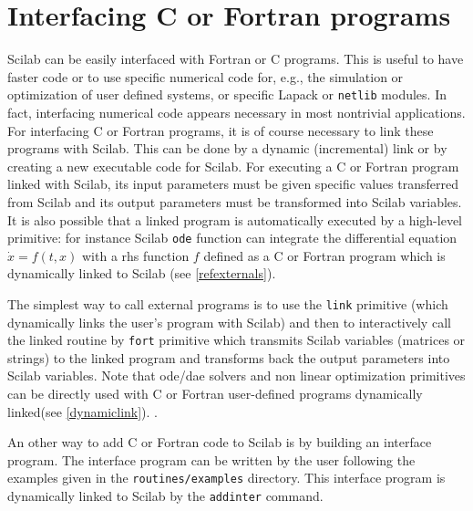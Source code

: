 
%

\chapter{Interfacing C or Fortran programs}

Scilab can be easily interfaced with Fortran or C programs. 
This is useful to have faster code or to use specific numerical
code for, e.g., the simulation or optimization of
user defined systems, or specific Lapack or {\tt netlib} modules. 
In fact, interfacing numerical code appears necessary in most
nontrivial applications. For
interfacing C or Fortran programs, it is of course necessary to link
these programs with Scilab. This can be done by a dynamic
(incremental) link or by creating a new executable code for Scilab.
For executing a C or Fortran program linked with Scilab, its
input parameters must be given specific values transferred from Scilab
and its output
parameters must be transformed into Scilab variables.
It is also possible that a linked program is automatically executed
by a high-level primitive: for instance Scilab {\tt ode} function
can integrate the differential equation $\dot{x} = f(t,x)$ with a
rhs function $f$ defined as a C or Fortran program which is
dynamically linked to Scilab (see \ref{refexternals}).


\bigskip
{}


The simplest way to call external programs is to use the  
{\tt link} primitive
(which dynamically links the user's program with Scilab)
and then to interactively call
the linked routine by {\tt fort} primitive
which transmits Scilab variables (matrices or strings) to the linked program
and transforms back the output parameters into Scilab variables. 
Note that ode/dae solvers and non linear optimization primitives
can be directly used with C or Fortran user-defined programs
dynamically linked(see \ref{dynamiclink}). . 

An other way to add C or Fortran code to Scilab is by 
building an interface program. The interface program can be written by
the user following the examples given in the {\tt routines/examples}
directory. This interface program is dynamically linked to Scilab
by the {\tt addinter} command.

